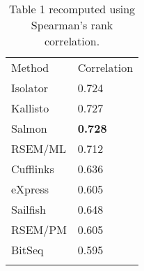 \documentclass{article}
\begin{document}
\begin{table}
\begin{center}
\label{table:rlsim:spearman}
\begin{tabular}[c]{@{}ll@{}}
\toprule\addlinespace
Method & Correlation
\\\addlinespace
\midrule
Isolator   & 0.724
\\\addlinespace
Kallisto   & 0.727
\\\addlinespace
Salmon     & \textbf{0.728}
\\\addlinespace
RSEM/ML    & 0.712
\\\addlinespace
Cufflinks  & 0.636
\\\addlinespace
eXpress    & 0.605
\\\addlinespace
Sailfish   & 0.648
\\\addlinespace
RSEM/PM    & 0.605
\\\addlinespace
BitSeq     & 0.595
\\\addlinespace
\bottomrule
\addlinespace
\end{tabular}
\caption{Table 1 recomputed using Spearman's rank correlation.}
\end{center}
\end{table}
\end{document}
